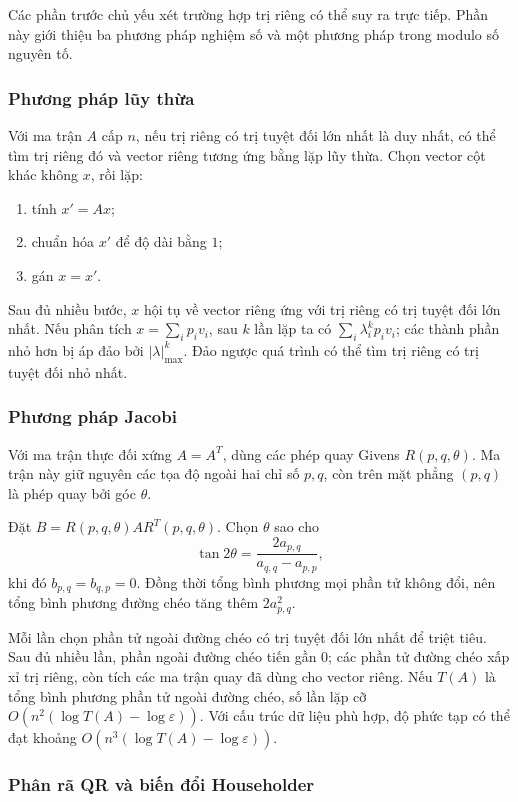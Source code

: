 \documentclass[11pt]{article}
\begin{document}
Các phần trước chủ yếu xét trường hợp trị riêng có thể suy ra trực tiếp. Phần
này giới thiệu ba phương pháp nghiệm số và một phương pháp trong modulo số
nguyên tố.

\subsubsection{Phương pháp lũy thừa}

Với ma trận \(A\) cấp \(n\), nếu trị riêng có trị tuyệt đối lớn nhất là duy
nhất, có thể tìm trị riêng đó và vector riêng tương ứng bằng lặp lũy thừa.
Chọn vector cột khác không \(x\), rồi lặp:
\begin{enumerate}
  \item tính \(x'=Ax\);
  \item chuẩn hóa \(x'\) để độ dài bằng \(1\);
  \item gán \(x=x'\).
\end{enumerate}
Sau đủ nhiều bước, \(x\) hội tụ về vector riêng ứng với trị riêng có trị tuyệt
đối lớn nhất. Nếu phân tích \(x=\sum_i p_i v_i\), sau \(k\) lần lặp ta có
\(\sum_i \lambda_i^k p_i v_i\); các thành phần nhỏ hơn bị áp đảo bởi
\(|\lambda|_{\max}^k\). Đảo ngược quá trình có thể tìm trị riêng có trị tuyệt
đối nhỏ nhất.

\subsubsection{Phương pháp Jacobi}

Với ma trận thực đối xứng \(A=A^T\), dùng các phép quay Givens
\(R(p,q,\theta)\). Ma trận này giữ nguyên các tọa độ ngoài hai chỉ số \(p,q\),
còn trên mặt phẳng \((p,q)\) là phép quay bởi góc \(\theta\).

Đặt \(B=R(p,q,\theta)AR^T(p,q,\theta)\). Chọn \(\theta\) sao cho
\[
  \tan 2\theta=\frac{2a_{p,q}}{a_{q,q}-a_{p,p}},
\]
khi đó \(b_{p,q}=b_{q,p}=0\). Đồng thời tổng bình phương mọi phần tử không đổi,
nên tổng bình phương đường chéo tăng thêm \(2a_{p,q}^2\).

Mỗi lần chọn phần tử ngoài đường chéo có trị tuyệt đối lớn nhất để triệt tiêu.
Sau đủ nhiều lần, phần ngoài đường chéo tiến gần \(0\); các phần tử đường chéo
xấp xỉ trị riêng, còn tích các ma trận quay đã dùng cho vector riêng. Nếu
\(T(A)\) là tổng bình phương phần tử ngoài đường chéo, số lần lặp cỡ
\(O(n^2(\log T(A)-\log\varepsilon))\). Với cấu trúc dữ liệu phù hợp, độ phức
tạp có thể đạt khoảng \(O(n^3(\log T(A)-\log\varepsilon))\).

\subsubsection{Phân rã QR và biến đổi Householder}
\end{document}
